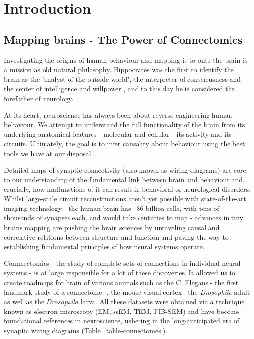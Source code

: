 
\chapter{Introduction}  

\section{Mapping brains - The Power of Connectomics} 

\label{Mapping Brains}
Investigating the origins of human behaviour and mapping it to onto the brain is a mission as old natural philosophy. Hippocrates was the first to identify the brain as the 'analyst of the outside world', the interpreter of consciousness and the center of intelligence and willpower \citep{breitenfeld2014hippocrates}, and to this day he is considered the forefather of neurology.

At its heart, neuroscience has always been about reverse engineering human behaviour. 
We attempt to understand the full functionality of the brain from its underlying anatomical features - molecular and cellular -  its activity and its circuits. Ultimately, the goal is to infer causality about behaviour using the best tools we have at our disposal \citep{mckinstry2013connectome}.

Detailed maps of synaptic connectivity (also known as wiring diagrams) are core to our understanding of the fundamental link between brain and behaviour and, crucially, how malfunctions of it can result in behavioral or neurological disorders. Whilst large-scale circuit reconstructions aren't yet possible with state-of-the-art imaging technology - the human brain has ~86 billion cells\cite{herculano2009human}, with tens of thousands of synapses each, and would take centuries to map -  advances in tiny brains mapping are pushing the brain sciences by unraveling causal and correlative relations between structure and function and paving the way to establishing fundamental principles of how neural systems operate. 

Connnectomics - the study of complete sets of connections in individual neural systems - is at large responsible for a lot of these discoveries. It allowed us to create roadmaps for brain of various animals such as the C. Elegans - the first landmark study of a connectome \citep{brenner1974genetics} -, the mouse visual cortex \citep{microns2025functional}, the \textit{Drosophila} adult \citep{scheffer2020connectome} as well as the \textit{Drosophila} larva\citep{ohyama2015multilevel, berck2016wiring,larderet2017opticlobe,eichler2017complete, eschbach2021circuits, eschbach2020recurrent}. All these datasets were obtained via a technique known as electron microscopy (EM, ssEM, TEM, FIB-SEM) and have become foundational references in neuroscience, ushering in the long-anticipated era of synaptic wiring diagrams (Table~\ref{table-connectomes}).

